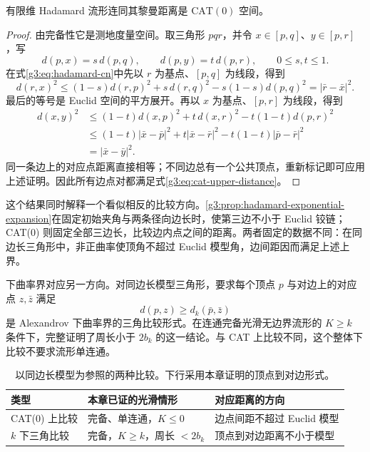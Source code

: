 \begin{theorem}\label{g3:thm:hadamard-cat-zero}
	有限维 Hadamard 流形连同其黎曼距离是 \(\mathrm{CAT}(0)\) 空间。
\end{theorem}
\begin{proof}
	由完备性它是测地度量空间。取三角形 \(pqr\)，并令 \(x\in[p,q]\)、\(y\in[p,r]\)，写
	\[
		d(p,x)=s\,d(p,q),\qquad d(p,y)=t\,d(p,r),
		\qquad 0\le s,t\le1.
	\]
	在式\eqref{g3:eq:hadamard-cn}中先以 \(r\) 为基点、\([p,q]\) 为线段，得到
	\[
		d(r,x)^2
		\le(1-s)d(r,p)^2+s\,d(r,q)^2-s(1-s)d(p,q)^2
		=|\bar r-\bar x|^2.
	\]
	最后的等号是 Euclid 空间的平方展开。再以 \(x\) 为基点、\([p,r]\) 为线段，得到
	\[
	\begin{aligned}
		d(x,y)^2
		&\le(1-t)d(x,p)^2+t\,d(x,r)^2-t(1-t)d(p,r)^2\\
		&\le(1-t)|\bar x-\bar p|^2+t|\bar x-\bar r|^2
		-t(1-t)|\bar p-\bar r|^2\\
		&=|\bar x-\bar y|^2.
	\end{aligned}
	\]
	同一条边上的对应点距离直接相等；不同边总有一个公共顶点，重新标记即可应用上述证明。因此所有边点对都满足式\eqref{g3:eq:cat-upper-distance}。
\end{proof}

这个结果同时解释一个看似相反的比较方向。\cref{g3:prop:hadamard-exponential-expansion}在固定初始夹角与两条径向边长时，使第三边不小于 Euclid 铰链；CAT(0) 则固定全部三边长，比较边内点之间的距离。两者固定的数据不同：在同边长三角形中，非正曲率使顶角不超过 Euclid 模型角，边间距因而满足上述上界。

\ProseParagraphBreak

下曲率界对应另一方向。对同边长模型三角形，要求每个顶点 \(p\) 与对边上的对应点 \(z,\bar z\) 满足
\begin{equation}\label{g3:eq:alexandrov-lower-distance}
	d(p,z)\ge d_k(\bar p,\bar z)
\end{equation}
是 Alexandrov 下曲率界的三角比较形式。在连通完备光滑无边界流形的 \(K\ge k\) 条件下，完整证明了周长小于 \(2b_k\) 的这一结论。与 CAT 上比较不同，这个整体下比较不要求流形单连通。

\begin{table}[htbp]
	\centering
	\caption{以同边长模型为参照的两种比较。下行采用本章证明的顶点到对边形式。}
	\label{g3:tab:triangle-comparison-directions}
	\begin{tabularx}{\textwidth}{@{}lXX@{}}
		\toprule
		类型 & 本章已证的光滑情形 & 对应距离的方向\\
		\midrule
		CAT(0) 上比较 & 完备、单连通，\(K\le0\) & 边点间距不超过 Euclid 模型\\
		\(k\) 下三角比较 & 完备，\(K\ge k\)，周长 \(<2b_k\) & 顶点到对边距离不小于模型\\
		\bottomrule
	\end{tabularx}
\end{table}

